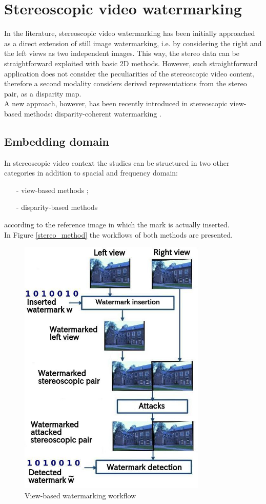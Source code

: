 \section{Stereoscopic video watermarking}

In the literature, stereoscopic video watermarking has been initially approached as a direct extension of still image watermarking, i.e. by considering the right and the left views as two independent images. This way, the stereo data can be straightforward exploited with basic 2D methods. However, such straightforward application does not consider the peculiarities of the stereoscopic video content, therefore a second modality considers derived representations from the stereo pair, as a disparity map.\\ 
A new approach, however, has been recently introduced in stereoscopic view-based methods: disparity-coherent watermarking \cite{DOER}.

\subsection{Embedding domain}
In stereoscopic video context the studies can be structured in two other categories in addition to spacial and frequency domain:
\begin{itemize}
\item[-] view-based methods \cite{16,17,18,19,20,21};
\item[-] disparity-based methods \cite{22}
\end{itemize}
according to the reference image in which the mark is actually inserted.\\
In Figure \ref{stereo_method} the workflows of both methods are presented.
\begin{figure}[h!]
\centering
\includegraphics[width=0.8\textwidth]{./img/views_domain.jpeg}
\caption{\small{View-based watermarking workflow}}
\label{fig:view}
\end{figure}

